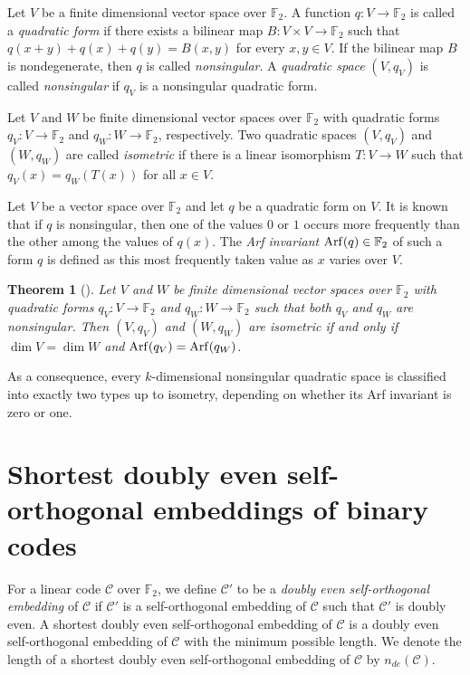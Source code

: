 \documentclass{article}
\newtheorem{theorem}{Theorem}[section]
\theoremstyle{definition}
\theoremstyle{remark}
\begin{document}
Let $V$ be a finite dimensional vector space over $\mathbb{F}_2$. A function $q:V\to \mathbb{F}_2$ is called a \textit{quadratic form} if there exists a bilinear map $B:V\times V\to \mathbb{F}_2$ such that $q(x+y)+q(x)+q(y)=B(x, y)$ for every $x, y\in V$. If the bilinear map $B$ is nondegenerate, then $q$ is called \textit{nonsingular}. A \textit{quadratic space} $(V, q_V)$ is called \textit{nonsingular} if $q_V$ is a nonsingular quadratic form.

Let $V$ and $W$ be finite dimensional vector spaces over $\mathbb{F}_2$ with quadratic forms $q_V:V\to \mathbb{F}_2$ and $q_W:W\to \mathbb{F}_2$, respectively. Two quadratic spaces $(V, q_V)$ and $(W, q_W)$ are called \textit{isometric} if there is a linear isomorphism $T:V\to W$ such that $q_V(x)=q_W(T(x))$ for all $x\in V$.

Let $V$ be a vector space over $\mathbb{F}_2$ and let $q$ be a quadratic form on $V$. It is known that if $q$ is nonsingular, then one of the values $0$ or $1$ occurs more frequently than the other among the values of $q(x)$. The \textit{Arf invariant} ${\rm{Arf}}(q)\in\mathbb{F}_2$ of such a form $q$ is defined as this most frequently taken value as $x$ varies over $V$.

\begin{theorem}[\cite{A-1941}]\label{Arfiso}
Let $V$ and $W$ be finite dimensional vector spaces over $\mathbb{F}_2$ with quadratic forms $q_V:V\to \mathbb{F}_2$ and $q_W:W\to \mathbb{F}_2$ such that both $q_V$ and $q_W$ are nonsingular. Then $(V, q_V)$ and $(W, q_W)$ are isometric if and only if $\dim V=\dim W$ and ${\rm{Arf}}(q_V)={\rm{Arf}}(q_W)$.
\end{theorem}
As a consequence, every $k$-dimensional nonsingular quadratic space is classified into exactly two types up to isometry, depending on whether its Arf invariant is zero or one.

\section{Shortest doubly even self-orthogonal embeddings of binary codes}
For a linear code $\mathcal{C}$ over $\mathbb{F}_2$, we define $\mathcal{C}'$ to be a \textit{doubly even self-orthogonal embedding} of $\mathcal{C}$ if $\mathcal{C}'$ is a self-orthogonal embedding of $\mathcal{C}$ such that $\mathcal{C}'$ is doubly even. A shortest doubly even self-orthogonal embedding of $\mathcal{C}$ is a doubly even self-orthogonal embedding of $\mathcal{C}$ with the minimum possible length. We denote the length of a shortest doubly even self-orthogonal embedding of $\mathcal{C}$ by $n_{de}(\mathcal{C})$.
\end{document}
